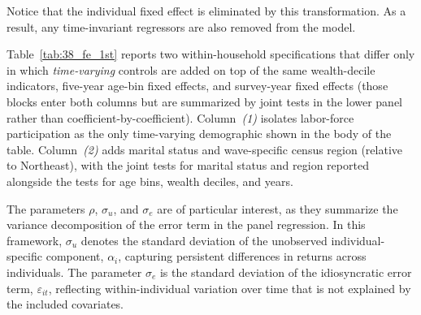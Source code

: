 \par Notice that the individual fixed effect is eliminated by this transformation. As a result, any time-invariant regressors are also removed from the model.

\par Table~\ref{tab:38_fe_1st} reports two within-household specifications that differ only in which \emph{time-varying} controls are added on top of the same wealth-decile indicators, five-year age-bin fixed effects, and survey-year fixed effects (those blocks enter both columns but are summarized by joint tests in the lower panel rather than coefficient-by-coefficient). Column~\textit{(1)} isolates labor-force participation as the only time-varying demographic shown in the body of the table. Column~\textit{(2)} adds marital status and wave-specific census region (relative to Northeast), with the joint tests for marital status and region reported alongside the tests for age bins, wealth deciles, and years.

\begin{table}[H]
\centering
\caption{\textbf{Panel OLS with Individual Fixed Effects}}
\label{tab:38_fe_1st}
\begin{threeparttable}
\begingroup
\setlength{\tabcolsep}{3pt}%
\renewcommand{\arraystretch}{0.70}%
\small%
\resizebox{\textwidth}{!}{%
%
}%
\endgroup
\begin{tablenotes}[flushleft]
\footnotesize
\item {}%
\end{tablenotes}
\end{threeparttable}
\end{table}


\par The parameters $\rho$, $\sigma_u$, and $\sigma_e$ are of particular interest, as they summarize the variance decomposition of the error term in the panel regression. In this framework, $\sigma_u$ denotes the standard deviation of the unobserved individual-specific component, $\alpha_i$, capturing persistent differences in returns across individuals. The parameter $\sigma_e$ is the standard deviation of the idiosyncratic error term, $\varepsilon_{it}$, reflecting within-individual variation over time that is not explained by the included covariates.

